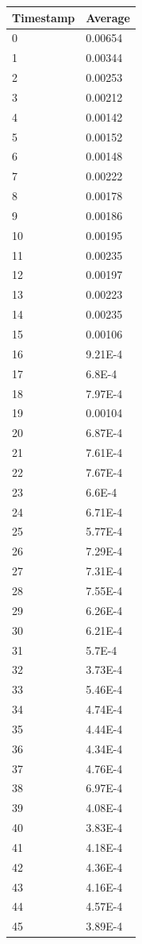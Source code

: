 %
%
\begin{tabular}{|l||l|}
\hline
	\textbf{Timestamp} & \textbf{Average} \\ \hline
	0 & 0.00654 \\ \hline
	1 & 0.00344 \\ \hline
	2 & 0.00253 \\ \hline
	3 & 0.00212 \\ \hline
	4 & 0.00142 \\ \hline
	5 & 0.00152 \\ \hline
	6 & 0.00148 \\ \hline
	7 & 0.00222 \\ \hline
	8 & 0.00178 \\ \hline
	9 & 0.00186 \\ \hline
	10 & 0.00195 \\ \hline
	11 & 0.00235 \\ \hline
	12 & 0.00197 \\ \hline
	13 & 0.00223 \\ \hline
	14 & 0.00235 \\ \hline
	15 & 0.00106 \\ \hline
	16 & 9.21E-4 \\ \hline
	17 & 6.8E-4 \\ \hline
	18 & 7.97E-4 \\ \hline
	19 & 0.00104 \\ \hline
	20 & 6.87E-4 \\ \hline
	21 & 7.61E-4 \\ \hline
	22 & 7.67E-4 \\ \hline
	23 & 6.6E-4 \\ \hline
	24 & 6.71E-4 \\ \hline
	25 & 5.77E-4 \\ \hline
	26 & 7.29E-4 \\ \hline
	27 & 7.31E-4 \\ \hline
	28 & 7.55E-4 \\ \hline
	29 & 6.26E-4 \\ \hline
	30 & 6.21E-4 \\ \hline
	31 & 5.7E-4 \\ \hline
	32 & 3.73E-4 \\ \hline
	33 & 5.46E-4 \\ \hline
	34 & 4.74E-4 \\ \hline
	35 & 4.44E-4 \\ \hline
	36 & 4.34E-4 \\ \hline
	37 & 4.76E-4 \\ \hline
	38 & 6.97E-4 \\ \hline
	39 & 4.08E-4 \\ \hline
	40 & 3.83E-4 \\ \hline
	41 & 4.18E-4 \\ \hline
	42 & 4.36E-4 \\ \hline
	43 & 4.16E-4 \\ \hline
	44 & 4.57E-4 \\ \hline
	45 & 3.89E-4 \\ \hline
\end{tabular}

